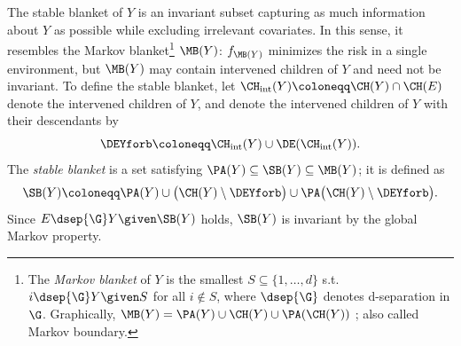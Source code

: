 The stable blanket of $Y$ is an invariant subset capturing as
much information about $Y$ as possible while excluding irrelevant covariates. 
In this sense, it resembles the Markov blanket\footnote{The \emph{Markov blanket} of $Y$ is the smallest
$S \subseteq \{1, \ldots, d\}$ s.t.\ $i \dsep{\G} Y \given S$ for all
$i \notin S$, where $\dsep{\G}$ denotes d-separation in $\G$. Graphically,
$\MB(Y) = \PA(Y) \cup \CH(Y) \cup \PA(\CH(Y))$
\citep[§~3.3]{pearlProbabilisticReasoningIntelligent1988}; also called Markov boundary.
} $\MB(Y)$:
$f_{\MB(Y)}$ minimizes the risk in a single environment, but $\MB(Y)$ may contain intervened children of $Y$
and need not be invariant. To define the stable blanket, let
$\CH_\mathrm{int}(Y) \coloneqq \CH(Y) \cap \CH(E)$ denote the intervened children of $Y$, and denote the intervened children of $Y$ with their descendants by
$$\DEYforb \coloneqq \CH_\mathrm{int}(Y) \cup \DE(\CH_\mathrm{int}(Y)).$$
The \emph{stable blanket} \citep[Def.~3.4]{pfisterStabilizingVariableSelection2021}
is a set satisfying
$\PA(Y) \subseteq \SB(Y) \subseteq \MB(Y)$; it is defined as
\begin{equation} \label{eq:stable_blanket_decomp}
    \SB(Y) \coloneqq \PA(Y) \cup \big(\CH(Y) \setminus \DEYforb \big) \cup \PA\big(\CH(Y) \setminus \DEYforb \big).
\end{equation}
Since $E \dsep{\G} Y \given \SB(Y)$ holds, $\SB(Y)$ is invariant by the global Markov property.

